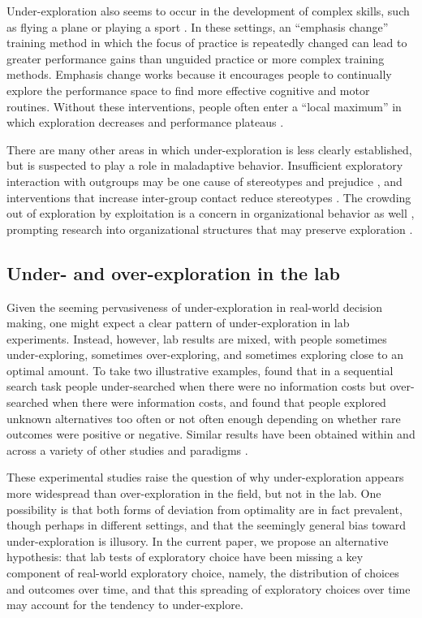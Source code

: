 \documentclass[10pt,letterpaper]{article}
\begin{document}
Under-exploration also seems to occur in the development of complex skills, such
as flying a plane or playing a sport \citep{Gopher1989}. In these settings, an ``emphasis
change'' training method in which the focus of practice is repeatedly changed
can lead to greater performance gains than unguided practice or more complex
training methods. Emphasis change works because it encourages people to
continually explore the performance space to find more effective cognitive and
motor routines. Without these interventions, people often enter a ``local
maximum'' in which exploration decreases and performance plateaus \citep{Yechiam2001}.

There are many other areas in which under-exploration is less clearly
established, but is suspected to play a role in maladaptive behavior.
Insufficient exploratory interaction with outgroups may be one cause of
stereotypes and prejudice \citep{Denrell2005most}, and interventions that
increase inter-group contact reduce stereotypes \citep{Shook2008}. The crowding
out of exploration by exploitation is a concern in organizational behavior as
well \citep{March1991, Levinthal1993}, prompting research into organizational
structures that may preserve exploration \citep{Fang2010}.

\subsection{Under- and over-exploration in the lab}

Given the seeming pervasiveness of under-exploration in real-world decision
making, one might expect a clear pattern of under-exploration in lab
experiments. Instead, however, lab results are mixed, with people sometimes
under-exploring, sometimes over-exploring, and sometimes exploring close to an
optimal amount. To take two illustrative examples, \citet{Zwick2003} found that
in a sequential search task people under-searched when there were no information
costs but over-searched when there were information costs, and
\citet{Teodorescu2014} found that people explored unknown alternatives too often
or not often enough depending on whether rare outcomes were positive or
negative. Similar results have been obtained within and across a variety of
other studies and paradigms
\citep{tversky1966information, Busemeyer1988, hertwig2004decisions, Navarro2016, Juni2016, Sang2011}.

These experimental studies raise the question of why under-exploration appears
more widespread than over-exploration in the field, but not in the lab. One
possibility is that both forms of deviation from optimality are in fact
prevalent, though perhaps in different settings, and that the seemingly general bias
toward under-exploration is illusory. In the current paper, we propose an
alternative hypothesis: that lab tests of exploratory choice have been missing a key component
of real-world exploratory choice, namely, the distribution of choices and
outcomes over time, and that this spreading of exploratory choices over time may
account for the tendency to under-explore.
\end{document}
